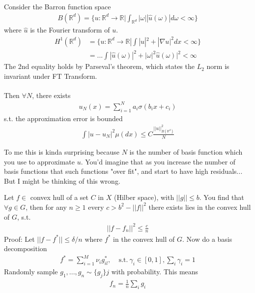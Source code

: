 \begin{theorem}
	[Barron 1993] Consider the Barron function space 
	\begin{align}
		B(\mathbb R^d) = \Big\{u:  \mathbb R^d \to \mathbb R \Big | \int_{\mathbb R^d} |\omega | | \hat u (\omega) | d\omega < \infty\Big\}
	\end{align}
	where $\hat u$ is the Fourier transform of $u$. 
	\begin{align}
		H^1(\mathbb R^d) & = \{u : \mathbb R^d \to \mathbb R | \int |u|^2 + |\nabla u|^2 dx < \infty\}\\
		& = ... \int |\hat u (\omega)|^2 + |\omega|^2 \hat u (\omega)|^2 < \infty
	\end{align}
	The 2nd equality holds by Parseval's theorem, which states the $L_2$ norm is invariant under FT Transform.
	\\
	\\
	Then $\forall N$, there exists 
	\begin{align}
		u_N(x) = \sum_{i=1}^N a_i \sigma(b_i x + c_i)
	\end{align} s.t. the approximation error is bounded
	\begin{align}
		\int |u - u_N|^2 \mu(dx) \leq C \frac{||u||^2_{B(\mathbb R^d)}}{N}
	\end{align}
	\begin{sidework}
		To me this is kinda surprising because $N$ is the number of basis function which you use to approximate $u$. You'd imagine that as you increase the number of basis functions that such functions "over fit", and start to have high residuals... But I might be thinking of this wrong.
	\end{sidework}	
\end{theorem}

\begin{lemma}
	Let $f \in$ convex hull of a set $C$ in $X$ (Hilber space), with $||g|| \leq b$. You find that $\forall g \in G$, then for any $n \geq 1$ every $c > b^2 - ||f||^2$ there exists lies in the convex hull of $G$, s.t.
	\begin{align}
		||f-f_n||^2 \leq \frac{c}{n}
	\end{align}
	Proof: Let $||f - f^*|| \leq \delta / n$ where $f^*$ in the convex hull of $G$. Now do a basis decomposition
	\begin{align}
		f^*= \sum_{i=1}^M \nu_i g_{il}^*, ~~~~~\text{s.t.}~ \gamma_i \in [0,1], \sum_i \gamma_i =1
	\end{align}Randomly sample $g_1,..., g_n \sim \{g_j\}j$ with probability. This means 
	\begin{align}
		f_n= \frac{1}{n} \sum_{i}g_i
	\end{align}
\end{lemma}

